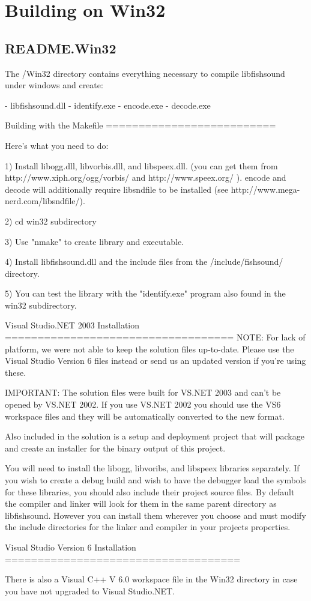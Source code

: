 \section{\-Building on \-Win32}
\label{group__win32}
\subsection{\-R\-E\-A\-D\-M\-E.\-Win32}\label{group__win32_win32}

\begin{DoxyCodeInclude}
The /Win32 directory contains everything necessary to compile
libfishsound under windows and create:

- libfishsound.dll
- identify.exe
- encode.exe
- decode.exe

Building with the Makefile
==========================

Here's what you need to do:

1) Install libogg.dll, libvorbis.dll, and libspeex.dll.
   (you can get them from http://www.xiph.org/ogg/vorbis/ 
    and http://www.speex.org/ ). encode and decode will
   additionally require libsndfile to be installed (see
   http://www.mega-nerd.com/libsndfile/).

2) cd win32 subdirectory

3) Use "nmake" to create library and executable.

4) Install libfishsound.dll and the include files from the
   /include/fishsound/ directory.

5) You can test the library with the "identify.exe" program
   also found in the win32 subdirectory.


Visual Studio.NET 2003 Installation
===================================
NOTE: For lack of platform, we were not able to keep the solution
files up-to-date. Please use the Visual Studio Version 6 files
instead or send us an updated version if you're using these.


IMPORTANT: The solution files were built for VS.NET 2003 and can't be
opened by VS.NET 2002. If you use VS.NET 2002 you should use the VS6
workspace files and they will be automatically converted to the new
format.

Also included in the solution is a setup and deployment project that
will package and create an installer for the binary output of this
project.

You will need to install the libogg, libvoribs, and libspeex libraries
separately. If you wish to create a debug build and wish to have the
debugger load the symbols for these libraries, you should also include
their project source files. By default the compiler and linker will
look for them in the same parent directory as libfishsound. However
you can install them wherever you choose and must modify the include
directories for the linker and compiler in your projects properties.


Visual Studio Version 6 Installation
====================================

There is also a Visual C++ V 6.0 workspace file in the Win32 directory
in case you have not upgraded to Visual Studio.NET.
\end{DoxyCodeInclude}
 